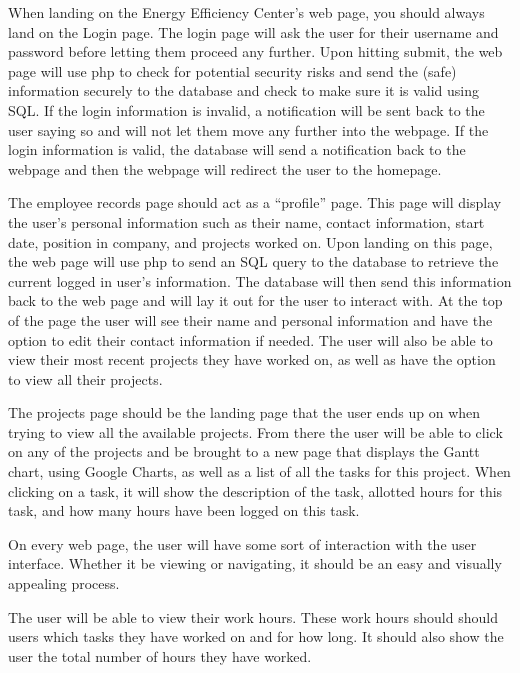 \documentclass[letterpaper,10pt,titlepage,journal,compsoc,draftclsnofoot,onecolumn]{IEEEtran}
\newcommand\tab[1][1cm]{\hspace*{#1}}
\begin{document}
\tab When landing on the Energy Efficiency Center's web page, you should always land on the Login page. The login page will ask the user for their username and password before letting them proceed any further. Upon hitting submit, the web page will use php to check for potential security risks and send the (safe) information securely to the database and check to make sure it is valid using SQL. If the login information is invalid, a notification will be sent back to the user saying so and will not let them move any further into the webpage. If the login information is valid, the database will send a notification back to the webpage and then the webpage will redirect the user to the homepage.\newline


\tab The employee records page should act as a “profile” page. This page will display the user's personal information such as their name, contact information, start date, position in company, and projects worked on. Upon landing on this page, the web page will use php to send an SQL query to the database to retrieve the current logged in user's information. The database will then send this information back to the web page and will lay it out for the user to interact with. At the top of the page the user will see their name and personal information and have the option to edit their contact information if needed. The user will also be able to view their most recent projects they have worked on, as well as have the option to view all their projects.  \newline


\tab The projects page should be the landing page that the user ends up on when trying to view all the available projects. From there the user will be able to click on any of the projects and be brought to a new page that displays the Gantt chart, using Google Charts, as well as a list of all the tasks for this project. When clicking on a task, it will show the description of the task, allotted hours for this task, and how many hours have been logged on this task. \newline


\tab On every web page, the user will have some sort of interaction with the user interface. Whether it be viewing or navigating, it should be an easy and visually appealing process. \newline


\tab The user will be able to view their work hours. These work hours should should users which tasks they have worked on and for how long. It should also show the user the total number of hours they have worked. \newline
\end{document}
